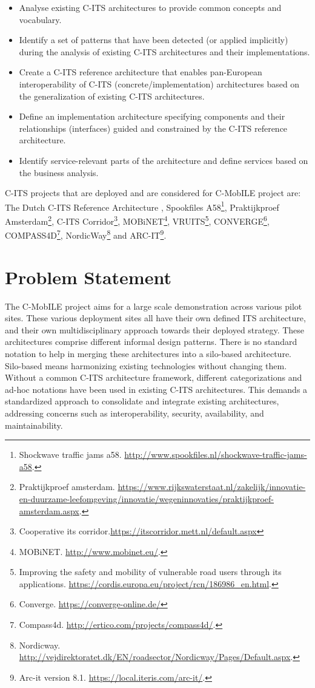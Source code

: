 \documentclass[conference]{IEEEtran}
\begin{document}
\begin{itemize}
  \item Analyse existing C-ITS architectures to provide common concepts and vocabulary.
  \item Identify a set of patterns that have been detected (or applied implicitly) during the analysis of existing C-ITS architectures and their implementations.
  \item Create a C-ITS reference architecture that enables pan-European interoperability of C-ITS (concrete/implementation) architectures based on the generalization of existing C-ITS architectures.
  \item Define an implementation architecture specifying components and their relationships (interfaces) guided and constrained by the C-ITS reference architecture.
  \item Identify service-relevant parts of the architecture and define services based on the business analysis.
\end{itemize}

C-ITS projects that are deployed and are considered for C-MobILE project are: The Dutch C-ITS Reference Architecture \cite{ditcm}, Spookfiles A58\footnote{Shockwave traffic jams a58. \url{http://www.spookfiles.nl/shockwave-traffic-jams-a58}.}, Praktijkproef Amsterdam\footnote{Praktijkproef amsterdam. \url{https://www.rijkswaterstaat.nl/zakelijk/innovatie-en-duurzame-leefomgeving/innovatie/wegeninnovaties/praktijkproef-amsterdam.aspx}.}, C-ITS Corridor\footnote{Cooperative its corridor.\url{https://itscorridor.mett.nl/default.aspx}}, MOBiNET\footnote{MOBiNET. \url{http://www.mobinet.eu/}.}, VRUITS\footnote{Improving the safety and mobility of vulnerable road users through its applications. \url{https://cordis.europa.eu/project/rcn/186986_en.html}.}, CONVERGE\footnote{Converge. \url{https://converge-online.de/}}, COMPASS4D\footnote{Compass4d. \url{http://ertico.com/projects/compass4d/}.}, NordicWay\footnote{Nordicway. \url{http://vejdirektoratet.dk/EN/roadsector/Nordicway/Pages/Default.aspx}.} and ARC-IT\footnote{Arc-it version 8.1. \url{https://local.iteris.com/arc-it/}.}.


\section{Problem Statement}

The C-MobILE project aims for a large scale demonstration across various pilot sites.
These various deployment sites all have their own defined ITS architecture, and their own multidisciplinary approach towards their deployed strategy.
These architectures comprise different informal design patterns.
There is no standard notation to help in merging these architectures into a silo-based architecture.
Silo-based means harmonizing existing technologies without changing them.
Without a common C-ITS architecture framework, different categorizations and ad-hoc notations have been used in existing C-ITS architectures.
This demands a standardized approach to consolidate and integrate existing architectures, addressing concerns such as interoperability, security, availability, and maintainability.
\end{document}
